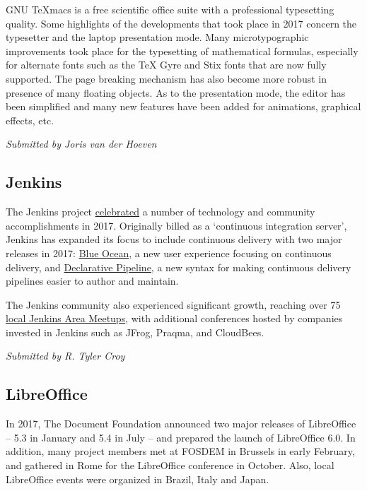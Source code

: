 \documentclass[a4paper]{report}
\begin{document}
GNU TeXmacs is a free scientific office suite with a professional
typesetting quality.  Some highlights of the developments that took
place in 2017 concern the typesetter and the laptop presentation mode.
Many microtypographic improvements took place for the typesetting of
mathematical formulas, especially for alternate fonts such as the TeX
Gyre and Stix fonts that are now fully supported.  The page breaking
mechanism has also become more robust in presence of many floating
objects.  As to the presentation mode, the editor has been simplified
and many new features have been added for animations, graphical effects,
etc.

{\em Submitted by Joris van der Hoeven}

\subsection{Jenkins}

The Jenkins project
\href{https://jenkins.io/blog/2017/12/31/new-year/}{celebrated} a number of
technology and community accomplishments in 2017. Originally billed as a
`continuous integration server', Jenkins has expanded its focus to include
continuous delivery with two major releases in 2017:
\href{https://jenkins.io/projects/blueocean}{Blue Ocean}, a new user experience
focusing on continuous delivery, and
\href{https://jenkins.io/doc/book/pipeline/syntax/#declarative-pipeline}{Declarative
Pipeline}, a new syntax for making continuous delivery pipelines easier to
author and maintain.

The Jenkins community also experienced significant growth, reaching over 75
\href{https://meetup.com/pro/jenkins}{local Jenkins Area Meetups}, with
additional conferences hosted by companies invested in Jenkins such as JFrog,
Praqma, and CloudBees.

{\em Submitted by R. Tyler Croy}

\subsection{LibreOffice}

In 2017, The Document Foundation announced two major releases of
LibreOffice -- 5.3 in January and 5.4 in July -- and prepared the launch
of LibreOffice 6.0. In addition, many project members met at FOSDEM in
Brussels in early February, and gathered in Rome for the LibreOffice
conference in October. Also, local LibreOffice events were organized in
Brazil, Italy and Japan.
\end{document}
